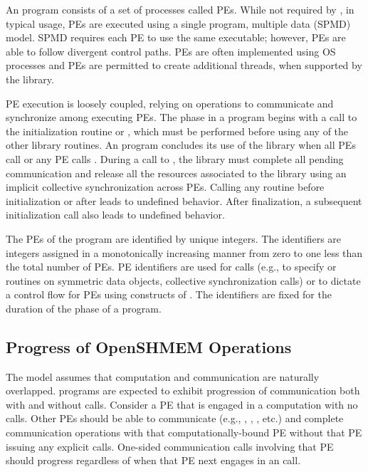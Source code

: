 An \openshmem program consists of a set of \openshmem processes called
\acp{PE}.  While not required by \openshmem, in typical usage, \acp{PE} are
executed using a single program, multiple data (\ac{SPMD}) model.  \ac{SPMD}
requires each \ac{PE} to use the same executable; however, \acp{PE} are able to
follow divergent control paths.  \acp{PE} are often implemented using \ac{OS}
processes and \acp{PE} are permitted to create additional
threads, when supported by the \openshmem library.

\ac{PE} execution is loosely coupled, relying on \openshmem operations to
communicate and synchronize among executing \acp{PE}.  The \openshmem phase in
a program begins with a call to the initialization routine 
or , which must be performed before using any of the
other \openshmem library routines. 
An \openshmem program concludes its use of the \openshmem library when all \acp{PE} call
 or any \ac{PE} calls .
During a call to , the \openshmem library must
complete all pending communication and release all the resources associated to
the library using an implicit collective synchronization across \acp{PE}.
Calling any \openshmem routine before initialization or after
 leads to undefined behavior. After finalization, a
subsequent initialization call also leads to undefined behavior.

The \acp{PE} of the \openshmem program are identified by unique integers.  The
identifiers are integers assigned in a monotonically increasing manner from zero
to one less than the total number of \acp{PE}. \ac{PE} identifiers are used for
\openshmem calls (e.g., to specify  or  routines on symmetric
data objects, collective synchronization calls) or to dictate a control flow for
\acp{PE} using constructs of \Cstd. The identifiers are fixed for
the duration of the \openshmem phase of a program.

\subsection{Progress of OpenSHMEM Operations}\label{subsec:progress}

The \openshmem model assumes that computation and communication are naturally
overlapped. \openshmem programs are expected to exhibit progression of
communication both with and without \openshmem calls. Consider a \ac{PE} that is
engaged in a computation with no \openshmem calls. Other \acp{PE} should be able
to communicate (e.g., , , , etc.) and
complete communication operations with that computationally-bound \ac{PE}
without that \ac{PE} issuing any explicit \openshmem calls. One-sided \openshmem
communication calls involving that \ac{PE} should progress regardless of when
that \ac{PE} next engages in an \openshmem call.

